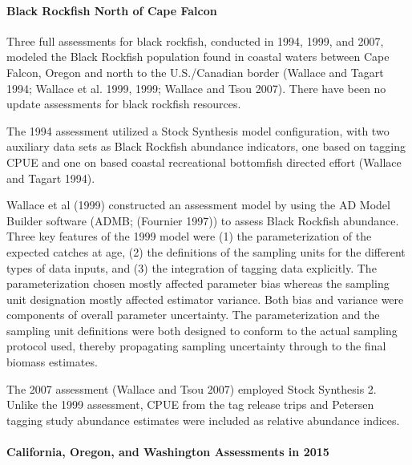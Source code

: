 \documentclass[11pt,
  english,
  letterpaper,
]{article}
\begin{document}
\hypertarget{black-rockfish-north-of-cape-falcon}{%
\paragraph{Black Rockfish North of Cape Falcon}\label{black-rockfish-north-of-cape-falcon}}

Three full assessments for black rockfish, conducted in 1994, 1999, and 2007, modeled the Black Rockfish population found in coastal waters between Cape Falcon, Oregon and north to the U.S./Canadian border (Wallace and Tagart 1994; Wallace et al. 1999, 1999; Wallace and Tsou 2007). There have been no update assessments for black rockfish resources.

The 1994 assessment utilized a Stock Synthesis model configuration, with two auxiliary data sets as Black Rockfish abundance indicators, one based on tagging CPUE and one on based coastal recreational bottomfish directed effort (Wallace and Tagart 1994).

Wallace et al (1999) constructed an assessment model by using the AD Model Builder software (ADMB; (Fournier 1997)) to assess Black Rockfish abundance. Three key features of the 1999 model were (1) the parameterization of the expected catches at age, (2) the definitions of the sampling units for the different types of data inputs, and (3) the integration of tagging data explicitly. The parameterization chosen mostly affected parameter bias whereas the sampling unit designation mostly affected estimator variance. Both bias and variance were components of overall parameter uncertainty. The parameterization and the sampling unit definitions were both designed to conform to the actual sampling protocol used, thereby propagating sampling uncertainty through to the final biomass estimates.

The 2007 assessment (Wallace and Tsou 2007) employed Stock Synthesis 2. Unlike the 1999 assessment, CPUE from the tag release trips and Petersen tagging study abundance estimates were included as relative abundance indices.

\hypertarget{california-oregon-and-washington-assessments-in-2015}{%
\paragraph{California, Oregon, and Washington Assessments in 2015}\label{california-oregon-and-washington-assessments-in-2015}}
\end{document}
